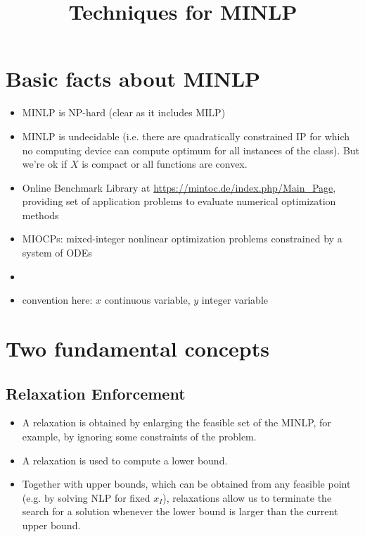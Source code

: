 \documentclass{article}
\title{\textbf{Techniques for MINLP}}
\begin{document}
\maketitle

\section{Basic facts about MINLP}
\begin{itemize}
\item MINLP is NP-hard (clear as it includes MILP)
\item MINLP is undecidable (i.e. there are quadratically constrained IP for which no computing device can compute optimum for all instances of the class). But we're ok if $X$ is compact or all functions are convex.
\item Online Benchmark Library at \url{https://mintoc.de/index.php/Main_Page}, providing set of application problems to evaluate numerical optimization methods
\item MIOCPs: mixed-integer nonlinear optimization problems constrained by a system of ODEs
\item
\item convention here: $x$ continuous variable, $y$ integer variable
\end{itemize}

\section{Two fundamental concepts}
\subsection{Relaxation Enforcement}
\begin{itemize}
\item A relaxation is obtained by enlarging the feasible set of the MINLP, for example, by ignoring some constraints of the problem.
\item A relaxation is used to compute a lower bound. 
\item Together with upper bounds, which can be obtained from any feasible point (e.g. by solving NLP for fixed $x_I$), relaxations allow us to terminate the search for a solution whenever the lower bound is larger than the current upper bound.
\end{itemize}
\end{document}
